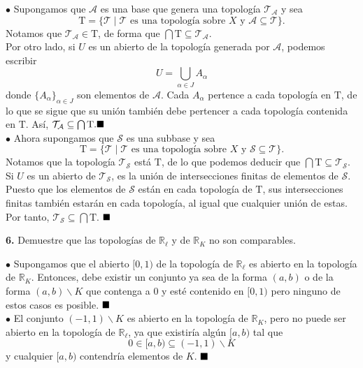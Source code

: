 \documentclass{article}
\begin{document}
$\bullet$ Supongamos que $\mathcal{A}$ es una base que genera una topología $\mathcal{T_{A}}$ y sea
$$ \mathrm{T} = \{ \mathcal{T} \mid \mathcal{T} \text{ es una topología sobre }X \text{ y }\mathcal{A}\subseteq \mathcal{T} \} .$$
Notamos que $\mathcal{T_{A}} \in \mathrm{T}$, de forma que $\bigcap \mathrm{T} \subseteq \mathcal{T_{A}}$.\\
Por otro lado,  si $U$ es un abierto de la topología generada por $\mathcal{A}$, podemos escribir
$$ U = \bigcup_{\alpha \in J} A_{\alpha} $$
donde $\{A_{\alpha} \}_{\alpha \in J}$ son elementos de $\mathcal{A}$. Cada $A_{\alpha}$ pertence a cada topología en $\mathrm{T}$, de lo que se sigue que su unión también debe pertencer a cada topología contenida en $\mathrm{T}.$ Así,  $\mathcal{T_{A}} \subseteq \bigcap \mathrm{T}. \hspace*{\fill} \blacksquare$\\

$\bullet $ Ahora supongamos que $\mathcal{S}$ es una subbase y sea
$$  \mathrm{T} = \{ \mathcal{T} \mid \mathcal{T} \text{ es una topología sobre }X \text{ y }\mathcal{S}\subseteq \mathcal{T} \} .$$
 Notamos que la topología $\mathcal{T}_{\mathcal{S}}$ está $\mathrm{T}$, de lo que podemos deducir que $\bigcap \mathrm{T} \subseteq \mathcal{T_{S}}$. Si $U$ es un abierto de $\mathcal{T_{S}}$, es la unión de intersecciones finitas de elementos de $\mathcal{S}$. Puesto que los elementos de $\mathcal{S}$ están en cada topología de $\mathrm{T}$, sus intersecciones finitas también estarán en cada topología, al igual que cualquier unión de estas. Por tanto, $\mathcal{T_{S}} \subseteq \bigcap \mathrm{T}$. $\hspace*{\fill} \blacksquare$\\ 
\begin{mybox}
\textbf{6. } Demuestre que las topologías de $\mathbb{R}_{\ell}$ y de $\mathbb{R}_{K}$ no son comparables. 	
\end{mybox}	

$\bullet$  Supongamos que el abierto $[0, 1)$ de la topología de $\mathbb{R}_{\ell}$ es abierto en la topología de $\mathbb{R}_{K}$. Entonces, debe existir un conjunto ya sea de la forma $(a, b)$ o de la forma $(a, b) \backslash K$ que contenga a $0$ y esté contenido en $[0, 1)$ pero ninguno de estos casos es posible. $\hspace*{\fill} \blacksquare$\\

$\bullet$ El conjunto $(-1, 1) \backslash K$ es abierto en la topología de $\mathbb{R}_{K}$, pero no puede ser abierto en la topología de $\mathbb{R}_{\ell}$, ya que existiría algún $[a, b)$ tal que
$$ 0 \in [a, b) \subseteq (-1, 1)\backslash K $$
y cualquier $[a, b)$ contendría elementos de $K$. $\hspace*{\fill} \blacksquare$\\
\end{document}
